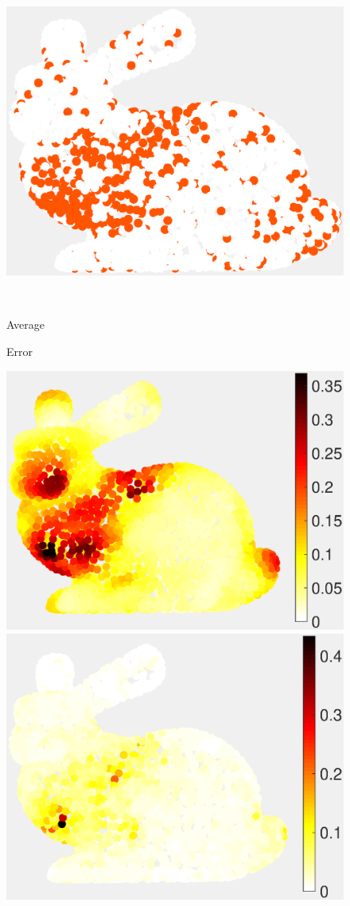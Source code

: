 \documentclass[journal, 10pt]{IEEEtran}
\begin{document}
\begin{figure}[H]
\begin{minipage}[m]{0.4\linewidth}
\centerline{\includegraphics[width=.85\linewidth]{fig_rec_band_selected_adapted}}
\end{minipage} \\
\begin{minipage}[m]{0.16\linewidth}
\centerline{\small{Average}}
\centerline{\small{Error}}
\end{minipage}
\begin{minipage}[m]{0.4\linewidth}
\centerline{\includegraphics[width=.85\linewidth]{fig_rec_low_error}}
\end{minipage}
\begin{minipage}[m]{0.4\linewidth}
\centerline{\includegraphics[width=.85\linewidth]{fig_rec_band_error}}

\end{minipage}
\end{figure}
\end{document}
